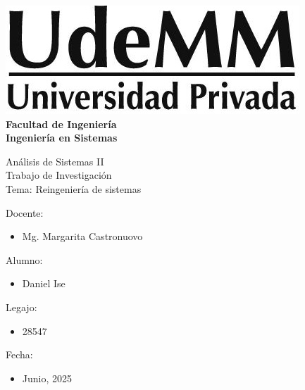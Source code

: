 \begin{titlepage}
    \begin{center}
        \vspace*{.5cm}
        \includegraphics[scale=.5]{../../../img/udemm-logo.png}\\
        \vspace{.2cm}
        \Large
        \textbf{Facultad de Ingeniería}\\
        \textbf{Ingeniería en Sistemas}\\
        \vspace{2cm}

        \Huge
        Análisis de Sistemas II \\
        Trabajo de Investigación \\
        Tema: Reingeniería de sistemas \\
        \vfill

        \raggedright
        \Large
        Docente:
        \begin{itemize}
            \item[] Mg. Margarita Castronuovo \\
        \end{itemize}
        Alumno:
        \begin{itemize}
            \item[] Daniel Ise
        \end{itemize}
        Legajo:
        \begin{itemize}
            \item[] 28547
        \end{itemize}
        Fecha:
        \begin{itemize}
            \item[] Junio, 2025
        \end{itemize}
    \end{center}
\end{titlepage}
